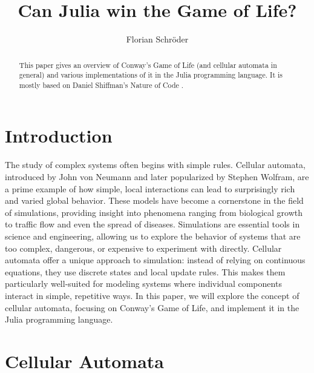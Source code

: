 \documentclass[a4paper,12pt]{llncs}
\numberwithin{equation}{section}
\begin{document}

%
\author{Florian Schröder}
%
\title{Can Julia win the Game of Life?}
%
%
\maketitle              %
\thispagestyle{empty}
%
%
\begin{abstract}
  This paper gives an overview of Conway's Game of Life (and cellular automata in general) and various implementations of it in the Julia programming language.
  It is mostly based on Daniel Shiffman's Nature of Code \cite{NOC}.
\end{abstract}


\section{Introduction}
The study of complex systems often begins with simple rules.
Cellular automata, introduced by John von Neumann and later popularized by Stephen Wolfram, are a prime example of how simple, local interactions can lead to surprisingly rich and varied global behavior.
These models have become a cornerstone in the field of simulations, providing insight into phenomena ranging from biological growth to traffic flow and even the spread of diseases.
Simulations are essential tools in science and engineering, allowing us to explore the behavior of systems that are too complex, dangerous, or expensive to experiment with directly.
Cellular automata offer a unique approach to simulation: instead of relying on continuous equations, they use discrete states and local update rules.
This makes them particularly well-suited for modeling systems where individual components interact in simple, repetitive ways.
In this paper, we will explore the concept of cellular automata, focusing on Conway's Game of Life, and implement it in the Julia programming language.

\section{Cellular Automata}
\end{document}
